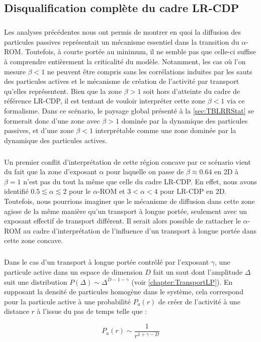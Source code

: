\subsection{Disqualification complète du cadre LR-CDP}

\subparagraph{}Les analyses précédentes nous ont permis de montrer en quoi la diffusion des particules passives représentait un mécanisme essentiel dans la transition du $\alpha$-ROM. Toutefois, à courte portée au minimum, il ne semble pas que celle-ci suffise à comprendre entièrement la criticalité du modèle. Notamment, les cas où l'on mesure $\beta < 1$ ne peuvent être compris sans les corrélations induites par les sauts des particules actives et le mécanisme de création de l'activité par transport qu'elles représentent. Bien que la zone $\beta >1$ soit hors d'atteinte du cadre de référence LR-CDP, il est tentant de vouloir interpréter cette zone $\beta < 1$ via ce formalisme. Dans ce scénario, le paysage global présenté à la \autoref{sec:TBLRRStat} se formerait donc d'une zone avec $\beta>1$ dominée par la dynamique des particules passives, et d'une zone $\beta<1$ interprétable comme une zone dominée par la dynamique des particules actives.

\subparagraph{}Un premier conflit d'interprétation de cette région concave par ce scénario vient du fait que la zone d'exposant $\alpha$ pour laquelle on passe de $\beta\approx 0.64$ en 2D à $\beta=1$ n'est pas du tout la même que celle du cadre LR-CDP. En effet, nous avons identifié $0.5\lesssim \alpha \lesssim 2$ pour le $\alpha$-ROM et $3<\alpha<4$ pour LR-CDP en 2D. Toutefois, nous pourrions imaginer que le mécanisme de diffusion dans cette zone agisse de la même manière qu'un transport à longue portée, seulement avec un exposant effectif de transport différent. Il serait alors possible de rattacher le $\alpha$-ROM au cadre d'interprétation de l'influence d'un transport à longue portée dans cette zone concave. 

\subparagraph{}Dans le cas d'un transport à longue portée contrôlé par l'exposant $\gamma$, une particule active dans un espace de dimension $D$ fait un saut dont l'amplitude $\Delta$ suit une distribution $P(\Delta)\sim\Delta^{D-1-\gamma}$ (voir \autoref{chapter:TransportLP}). En supposant la densité de particules homogène dans le système, cela correspond pour la particule active à une probabilité $P_a(r)$ de créer de l'activité à une distance $r$ à l’issue du pas de temps telle que :

\begin{equation}
	P_a(r) \sim \frac{1}{r^{1+\gamma-D}}
	\label{eq:sautabsoupas}
\end{equation}

